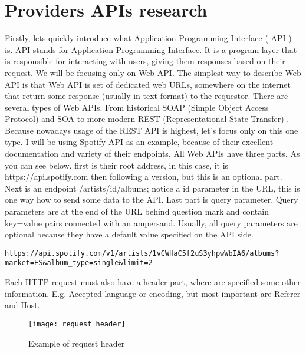 \section{Providers APIs research}

Firstly, lets quickly introduce what Application  Programming Interface ( API ) is. API stands for Application Programming Interface. It is a program layer that is responsible for interacting with users, giving them responses based on their request. We will be focusing only on Web API. The simplest way to describe Web API is that Web API is set of dedicated web URLs, somewhere on the internet that return some response (usually in text format) to the requestor. There are several types of Web APIs. From historical SOAP (Simple Object Access Protocol) \parencite{soap} and SOA to more modern REST (Representational State Transfer) \parencite{rest}. Because nowadays usage of the REST API is highest, let's focus only on this one type. I will be using Spotify API \parencite{spotify_api} as an example, because of their excellent documentation and variety of their endpoints. All Web APIs have three parts. As you can see below, first is their root address, in this case, it is https://api.spotify.com then following a version, but this is an optional part. Next is an endpoint /artists/{id}/albums; notice a {id} parameter in the URL, this is one way how to send some data to the API. Last part is query parameter. Query parameters are at the end of the URL behind question mark and contain key=value pairs connected with an ampersand. Usually, all query parameters are optional because they have a default value specified on the API side.

\vskip 0.1in

\noindent \colorbox{ltGray}{\parbox{\textwidth}{\textcolor{black!90}{\nolinkurl{https://api.spotify.com/v1/artists/1vCWHaC5f2uS3yhpwWbIA6/albums?market=ES&album_type=single&limit=2}}}}

\vskip 0.2in

Each HTTP \parencite{http} request must also have a header part, where are specified some other information. E.g. Accepted-language or encoding, but most important are Referer and Host.

\begin{figure}[th]
    \centering
    \texttt{[image: request\_header]}
    \decoRule
    \caption[Request header]{Example of request header}
    \label{fig:request_header}
 \end{figure}

